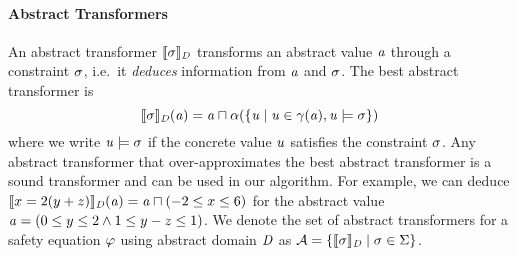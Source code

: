 
\paragraph{Abstract Transformers}
%
%
An abstract transformer $\llbracket \sigma\rrbracket_{\mathit{D}}$ transforms an abstract value $\mathit{a}$ through a
constraint $\sigma$, i.e.\ it \emph{deduces} information from $\mathit{a}$ and $\sigma$.
The best abstract transformer is 
\begin{equation}\label{eq:abstrans}
\llbracket \sigma\rrbracket_{\mathit{D}}(\mathit{a})=\mathit{a}\sqcap\alpha(\{\mathit{u}\mid \mathit{u}\in\gamma(\mathit{a}), \mathit{u}\models \sigma\})
\end{equation}
 where we write 
$\mathit{u}\models \sigma$ if the concrete value $\mathit{u}$ satisfies the constraint $\sigma$.
Any abstract transformer that over-approximates the best abstract
transformer is a sound transformer and can be used in our algorithm.
%
For example, we can deduce $\llbracket x=2(y+z)\rrbracket_{\mathit{D}}(\mathit{a})=\mathit{a}\sqcap(-2\leq x\leq 6)$ for the abstract value $\mathit{a}=(0\leq y \leq 2 \wedge 1 \leq y-z \leq 1)$.
%
We denote the set of abstract transformers for a safety equation
$\varphi$ using abstract domain $\mathit{D}$ as
$\mathcal{A}=\{\llbracket \sigma\rrbracket_{\mathit{D}}\mid
\sigma\in\Sigma\}$.

